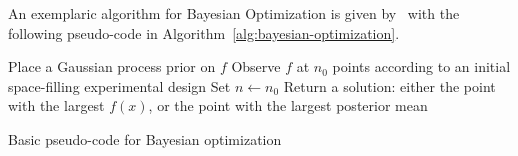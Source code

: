 An exemplaric algorithm for Bayesian Optimization is given by~\textcite{Frazier-Bayesian-Optimization} with the following pseudo-code in Algorithm~\ref{alg:bayesian-optimization}.
\begin{algorithm}[ht!]
    \SetAlgoLined
    \DontPrintSemicolon
    Place a Gaussian process prior on $f$\;
    Observe $f$ at $n_0$ points according to an initial space-filling experimental design\;
    Set $n \leftarrow n_0$\;
    Return a solution: either the point with the largest $f(x)$, or the point with the largest posterior mean\;
    \caption{Basic pseudo-code for Bayesian optimization}
    \label{alg:bayesian-optimization}
\end{algorithm}

